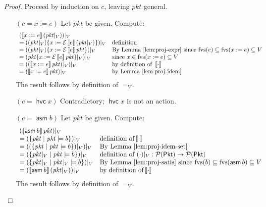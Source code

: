 \documentclass{article}
\newcommand{\pkt}{\mathit{pkt}}
\newcommand{\denote}[1]{\left\llbracket#1\right\rrbracket}
\newcommand{\edenote}[1]{\mathcal{E}\denote{#1}}
\newcommand{\Pkt}{\mathsf{Pkt}}
\newcommand{\assume}{\mathop{\mathsf{asm}}}
\newcommand{\havoc}[1]{\mathop{\mathsf{hvc}}#1}
\newcommand{\fvs}{\textrm{fvs}}
\theoremstyle{plain}
\theoremstyle{definition}
\theoremstyle{remark}
\begin{document}
\begin{proof}
  Proceed by induction on $c$, leaving $\pkt$ general.
  \begin{enumerate}[align=left]
  \item[$(c = x:=e)$] Let $\pkt$ be given. Compute:
    \[\begin{array}{ll}
    (\denote{x:=e} (\pkt|_V))|_V\\
    = ((\pkt|_V)\{x:=\edenote{e}(\pkt|_V)\})|_V
    & \text{definition} \\
    = ((\pkt|_V)\{x := \edenote{e}\pkt\})|_V
    & \text{By Lemma~\ref{lem:proj-expr} since } \fvs(e) \subseteq \fvs(x := e) \subseteq V \\
    = (\pkt\{x := \edenote{e}\pkt\}|_V)|_V
    & \text{since } x \in \fvs(x:=e) \subseteq V \\
    = ((\denote{x:=e}\pkt)|_V)|_V
    & \text{by definition of }\denote{\cdot}\\
    = (\denote{x:=e}\pkt)|_V
    & \text{by Lemma~\ref{lem:proj-idem}}
    \end{array}\]
    The result follows by definition of $=_V$.

  \item[$(c = \havoc x)$] Contradictory; $\havoc x$ is not an action.
  \item[$(c = \assume b)$]
    Let $\pkt$ be given. Compute:
    \[\begin{array}{ll}
    (\denote{\assume b} \pkt)|_V \\
    = (\{\pkt \mid \pkt \models b\})|_V
    & \text{definition of}\denote\cdot\\
    = ((\{\pkt \mid \pkt \models b\})|_V)|_V
    & \text{By Lemma~\ref{lem:proj-idem-set}} \\
    = (\{\pkt|_V \mid \pkt \models b\})|_V
    & \text{definition of }(\cdot)|_V : \mathcal P (\Pkt) \to \mathcal P (\Pkt) \\
    = (\{\pkt|_V \mid \pkt|_V \models b\})|_V
    & \text{By Lemma~\ref{lem:proj-satis} since } \fvs(b) \subseteq \fvs(\assume b) \subseteq V \\
    = (\denote{\assume b}(\pkt|_V))|_V
    & \text{by definition of}\denote\cdot
    \end{array}
    \]
    The result follows by definition of $=_V$.


\end{enumerate}
\end{proof}
\end{document}
